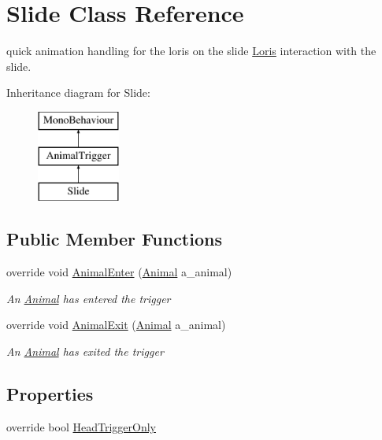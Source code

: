 \hypertarget{class_slide}{}\section{Slide Class Reference}
\label{class_slide}


quick animation handling for the loris on the slide \mbox{\hyperlink{class_loris}{Loris}} interaction with the slide.  


Inheritance diagram for Slide\+:\begin{figure}[H]
\begin{center}
\leavevmode
\includegraphics[height=3.000000cm]{class_slide}
\end{center}
\end{figure}
\subsection*{Public Member Functions}
\begin{DoxyCompactItemize}
\item 
override void \mbox{\hyperlink{class_slide_a9ff3efb4447801dcd251378a66d5afa5}{Animal\+Enter}} (\mbox{\hyperlink{class_animal}{Animal}} a\+\_\+animal)
\begin{DoxyCompactList}\small\item\em An \mbox{\hyperlink{class_animal}{Animal}} has entered the trigger \end{DoxyCompactList}\item 
override void \mbox{\hyperlink{class_slide_a69c08279e8270df11ec45fba09dd12ba}{Animal\+Exit}} (\mbox{\hyperlink{class_animal}{Animal}} a\+\_\+animal)
\begin{DoxyCompactList}\small\item\em An \mbox{\hyperlink{class_animal}{Animal}} has exited the trigger \end{DoxyCompactList}\end{DoxyCompactItemize}
\subsection*{Properties}
\begin{DoxyCompactItemize}
\item 
override bool \mbox{\hyperlink{class_slide_a53257fd15de04d2f6a5c7c6a7ba38487}{Head\+Trigger\+Only}}
\end{DoxyCompactItemize}
